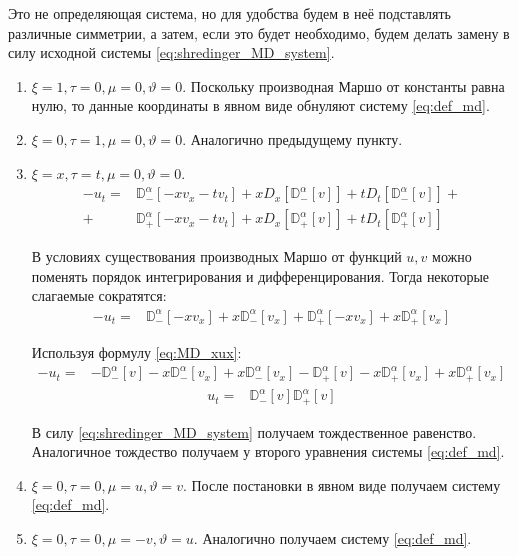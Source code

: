 \documentclass[a4paper, fontsize=14pt]{article}
\newcommand{\MD}[2]{\mathbb{D}_{#1}^{\alpha}[#2]} %
\newcommand{\D}[3]{D_{#1}^{#2} \left[ #3 \right]} %
\begin{document}
Это не определяющая система, но для удобства будем в неё подставлять различные симметрии, а затем, если это будет необходимо, будем делать замену в силу исходной системы \eqref{eq:shredinger_MD_system}.
\begin{enumerate}
  \item $\xi = 1, \tau = 0, \mu = 0, \vartheta = 0$. Поскольку производная Маршо от константы равна нулю, то данные координаты в явном виде обнуляют систему \eqref{eq:def_md}.
  \item $\xi = 0, \tau = 1, \mu = 0, \vartheta = 0$. Аналогично предыдущему пункту.
  \item $\xi = x, \tau = t, \mu = 0, \vartheta = 0$.
  \begin{equation*}
    \begin{aligned}
      -u_t =& \MD{-}{-x v_x - t v_t} + x \D{x}{}{\MD{-}{v}} + t \D{t}{}{\MD{-}{v}} + \\
      + &\MD{+}{-x v_x - t v_t} + x \D{x}{}{\MD{+}{v}} + t \D{t}{}{\MD{+}{v}}
    \end{aligned}
  \end{equation*}

  В условиях существования производных Маршо от функций $u, v$  можно поменять порядок интегрирования и дифференцирования. Тогда некоторые слагаемые сократятся:
  \begin{equation*}
    \begin{aligned}
      -u_t =& \MD{-}{-x v_x} + x \MD{-}{v_x} + \MD{+}{-x v_x} + x \MD{+}{v_x}
    \end{aligned}
  \end{equation*}

  Используя формулу \eqref{eq:MD_xux}:
  \begin{equation*}
    \begin{aligned}
      -u_t =& - \MD{-}{v} - x \MD{-}{v_x} + x \MD{-}{v_x} - \MD{+}{v} - x \MD{+}{v_x} + x \MD{+}{v_x}
    \end{aligned}
  \end{equation*}
  \begin{equation*}
    \begin{aligned}
      u_t =& \MD{-}{v} \MD{+}{v}
    \end{aligned}
  \end{equation*}

  В силу \eqref{eq:shredinger_MD_system} получаем тождественное равенство.
  Аналогичное тождество получаем у второго уравнения системы \eqref{eq:def_md}.

  \item $\xi = 0, \tau = 0, \mu = u, \vartheta = v$. После постановки в явном виде получаем систему \eqref{eq:def_md}.
  \item $\xi = 0, \tau = 0, \mu = -v, \vartheta = u$. Аналогично получаем систему \eqref{eq:def_md}.
\end{enumerate}
\end{document}
